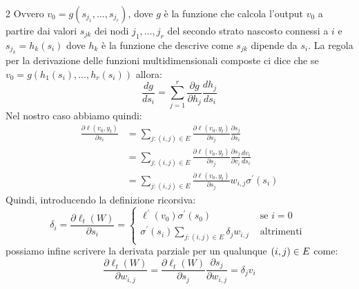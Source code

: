 \documentclass[\main/main.tex]{subfiles}
\begin{document}
\begin{definition}
\begin{multicols}{2}
        Ovvero \(v_0 = g\left(s_{j_{1}}, \ldots, s_{j_{r}}\right)\), dove \(g\) è la funzione che calcola l'output \(v_0\) a partire dai valori \(s_{jk}\) dei nodi \(j_1, \ldots, j_r\) del secondo strato nascosto connessi a \(i\) e \(s_{j_{k}}=h_{k}\left(s_{i}\right)\) dove \(h_k\) è la funzione che descrive come \(s_{jk}\) dipende da \(s_i\). La regola per la derivazione delle funzioni multidimensionali composte ci dice che se \(v_{0}=g\left(h_{1}\left(s_{i}\right), \ldots, h_{r}\left(s_{i}\right)\right)\) allora:
        \[\frac{d g}{d s_{i}}=\sum_{j=1}^{r} \frac{\partial g}{\partial h_{j}} \frac{d h_{j}}{d s_{i}}\]
        Nel nostro caso abbiamo quindi:
        \begin{align*}
            \frac{\partial \ell\left(v_{0}, y_{t}\right)}{\partial s_{i}}&=\sum_{j :(i, j) \in E} \frac{\partial \ell\left(v_{0}, y_{t}\right)}{\partial s_{j}} \frac{\partial s_{j}}{\partial s_{i}}\\
            &=\sum_{j :(i, j) \in E} \frac{\partial \ell\left(v_{0}, y_{t}\right)}{\partial s_{j}} \frac{\partial s_{j}}{\partial v_{i}} \frac{d v_{i}}{d s_{i}}\\
            &=\sum_{j :(i, j) \in E} \frac{\partial \ell\left(v_{0}, y_{t}\right)}{\partial s_{j}} w_{i, j} \sigma^{\prime}\left(s_{i}\right)
        \end{align*}
        Quindi, introducendo la definizione ricorsiva:
        \[\delta_{i}=\frac{\partial \ell_{t}(W)}{\partial s_{i}}=\left\{\begin{array}{cc}{\ell^{\prime}\left(v_{0}\right) \sigma^{\prime}\left(s_{0}\right)} & {\text { se } i=0} \\ {\sigma^{\prime}\left(s_{i}\right) \sum_{j :(i, j) \in E} \delta_{j} w_{i, j}} & {\text { altrimenti }}\end{array}\right.\]
        possiamo infine scrivere la derivata parziale per un qualunque \(\left(i,j\right) \in E\) come:
        \[\frac{\partial \ell_{t}(W)}{\partial w_{i, j}}=\frac{\partial \ell_{t}(W)}{\partial s_{j}} \frac{\partial s_{j}}{\partial w_{i, j}}=\delta_{j} v_{i}\]
    \end{multicols}
\end{definition}
\end{document}
